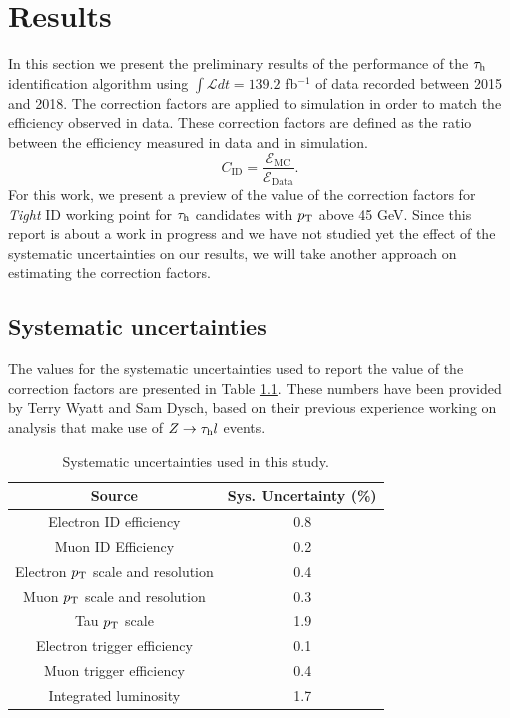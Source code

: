 \chapter{Results}\label{chap5}
In this section we present the preliminary results of the performance of the $\tau_\text{h}$ identification algorithm using $\int\mathcal{L} dt=139.2$ fb$^{-1}$ of data recorded between 2015 and 2018.
The correction factors are applied to simulation in order to match the efficiency observed in data. These correction factors are defined as the ratio between the efficiency measured in data and in simulation.
\begin{equation}
C_{\text{ID}}=\frac{\mathcal{E}_{\text{MC}}}{\mathcal{E}_{\text{Data}}}.
\end{equation}
For this work, we present a preview of the value of the correction factors for \textit{Tight} ID working point for $\tau_\text{h}$ candidates with $p_\text{T}$ above 45 GeV. Since this report is about a work in progress and we have not studied yet the effect of the systematic uncertainties on our results, we will take another approach on estimating the correction factors.

\section{Systematic uncertainties}
The values for the systematic uncertainties used to report the value of the correction factors are presented in Table \ref{Tab5}. These numbers have been provided by Terry Wyatt and Sam Dysch, based on their previous experience working on analysis that make use of $Z\to\tau_\text{h} l$ events.
\begin{table}[H]
	\centering
	\begin{tabular}{cc}
		\hline
		\multicolumn{1}{|c|}{Source}        & \multicolumn{1}{c|}{Sys. Uncertainty (\%)} \\ \hline
		Electron ID efficiency              & 0.8                                        \\
		Muon ID Efficiency                  & 0.2                                        \\
		Electron $p_\text{T}$ scale and resolution & 0.4                                        \\
		Muon $p_\text{T}$ scale and resolution     & 0.3                                        \\
		Tau $p_\text{T}$ scale                     & 1.9                                        \\
		Electron trigger efficiency         & 0.1                                        \\
		Muon trigger efficiency             & 0.4                                        \\ 
		Integrated luminosity               & 1.7                                        \\ \hline
	\end{tabular}
	\caption{Systematic uncertainties used in this study.}
	\label{Tab5}
\end{table}
